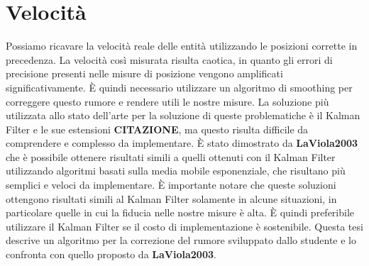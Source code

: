 \section{Velocità}
\label{sec:funzionalita-velocita}
Possiamo ricavare la velocità reale delle entità utilizzando le posizioni corrette in precedenza.
La velocità così misurata risulta caotica, in quanto gli errori di precisione presenti nelle misure di posizione vengono amplificati significativamente.
È quindi necessario utilizzare un algoritmo di smoothing per correggere questo rumore e rendere utili le nostre misure.
La soluzione più utilizzata allo stato dell'arte per la soluzione di queste problematiche è il Kalman Filter e le sue estensioni \textbf{CITAZIONE}, ma questo risulta difficile da comprendere e complesso da implementare.
È stato dimostrato da \textbf{LaViola2003} che è possibile ottenere risultati simili a quelli ottenuti con il Kalman Filter utilizzando algoritmi basati sulla media mobile esponenziale, che risultano più semplici e veloci da implementare.
È importante notare che queste soluzioni ottengono risultati simili al Kalman Filter solamente in alcune situazioni, in particolare quelle in cui la fiducia nelle nostre misure è alta.
È quindi preferibile utilizzare il Kalman Filter se il costo di implementazione è sostenibile.
Questa tesi descrive un algoritmo per la correzione del rumore sviluppato dallo studente e lo confronta con quello proposto da \textbf{LaViola2003}.

